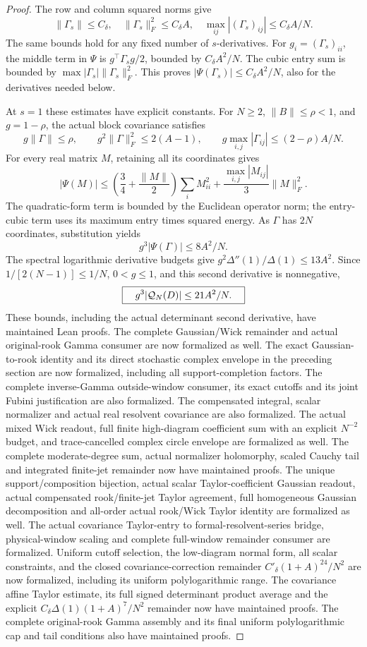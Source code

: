 \begin{proof}
The row and column squared norms give
\[
 \|\Gamma_s\|\leq C_\delta,\quad
 \|\Gamma_s\|_F^2\leq C_\delta A,\quad
 \max_{ij}|(\Gamma_s)_{ij}|\leq C_\delta A/N.
\]
The same bounds hold for any fixed number of \(s\)-derivatives.
For \(g_i=(\Gamma_s)_{ii}\), the middle term in \(\Psi\) is
\(g^\top\Gamma_s g/2\), bounded by \(C_\delta A^2/N\).
The cubic entry sum is bounded by
\(\max|\Gamma_s|\|\Gamma_s\|_F^2\).
This proves \(|\Psi(\Gamma_s)|\leq C_\delta A^2/N\),
also for the derivatives needed below.

At \(s=1\) these estimates have explicit constants.
For \(N\geq2\), \(\|B\|\leq\rho<1\), and \(g=1-\rho\),
the actual block covariance satisfies
\[
 g\|\Gamma\|\leq\rho,\qquad
 g^2\|\Gamma\|_F^2\leq2(A-1),\qquad
 g\max_{i,j}|\Gamma_{ij}|\leq(2-\rho)A/N.
\]
For every real matrix \(M\), retaining all its coordinates gives
\[
 |\Psi(M)|\leq
 \left(\frac34+\frac{\|M\|}{2}\right)\sum_i M_{ii}^2
       +\frac{\max_{i,j}|M_{ij}|}{3}\|M\|_F^2.
\]
The quadratic-form term is bounded by the Euclidean operator norm;
the entry-cubic term uses its maximum entry times squared energy.
As \(\Gamma\) has \(2N\) coordinates, substitution yields
\[
 g^3|\Psi(\Gamma)|\leq8A^2/N.
\]
The spectral logarithmic derivative budgets give
\(g^2\Delta''(1)/\Delta(1)\leq13A^2\).
Since \(1/[2(N-1)]\leq1/N\), \(0<g\leq1\), and this
second derivative is nonnegative,
\[
 \boxed{\quad g^3|{\cal Q}_N(D)|\leq21A^2/N.\quad}
\]
These bounds, including the actual determinant second derivative, have
maintained Lean proofs. The complete Gaussian/Wick remainder and actual
original-rook Gamma consumer are now formalized as well.
The exact Gaussian-to-rook identity and its direct stochastic complex
envelope in the preceding section are now formalized, including
all support-completion factors. The complete inverse-Gamma outside-window
consumer, its exact cutoffs and its joint Fubini justification are also
formalized. The compensated integral, scalar normalizer and actual
real resolvent covariance are also formalized. The actual mixed Wick
readout, full finite high-diagram coefficient sum with an explicit
\(N^{-2}\) budget, and trace-cancelled complex circle envelope are
formalized as well. The complete moderate-degree sum, actual normalizer
holomorphy, scaled Cauchy tail and integrated finite-jet remainder now
have maintained proofs. The unique support/composition bijection,
actual scalar Taylor-coefficient Gaussian readout, actual compensated
rook/finite-jet Taylor agreement, full homogeneous Gaussian decomposition
and all-order actual rook/Wick Taylor identity are formalized as well.
The actual covariance Taylor-entry to formal-resolvent-series bridge,
physical-window scaling and complete full-window remainder consumer are
formalized. Uniform cutoff selection, the low-diagram normal form,
all scalar constraints, and the closed covariance-correction remainder
\(C'_\delta(1+A)^{24}/N^2\) are now formalized, including its uniform
polylogarithmic range. The covariance affine Taylor estimate, its full
signed determinant product average and the explicit
\(C_\delta\Delta(1)(1+A)^7/N^2\) remainder now have maintained proofs.
The complete original-rook Gamma assembly and its final uniform
polylogarithmic cap and tail conditions also have maintained proofs.


\end{proof}

